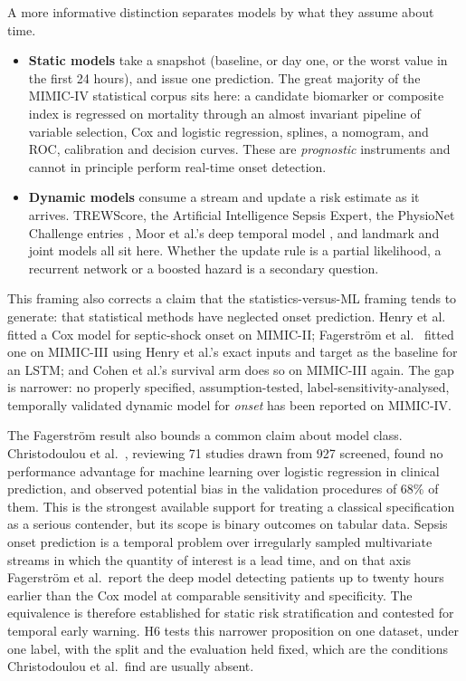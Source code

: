 A more informative distinction separates models by what they assume about
time.

\begin{itemize}
    \item \textbf{Static models} take a snapshot (baseline, or day one, or
    the worst value in the first 24 hours), and issue one prediction. The
    great majority of the MIMIC-IV statistical corpus sits here: a candidate
    biomarker or composite index is regressed on mortality through an almost
    invariant pipeline of variable selection, Cox and logistic regression,
    splines, a nomogram, and ROC, calibration and decision curves. These are
    \emph{prognostic} instruments and cannot in principle perform real-time
    onset detection.
    \item \textbf{Dynamic models} consume a stream and update a risk estimate as
    it arrives. TREWScore, the Artificial Intelligence Sepsis Expert, the
    PhysioNet Challenge entries \cite{reyna2020utility}, Moor et al.'s deep
    temporal model \cite{moor2023review}, and landmark and joint models all sit
    here. Whether the update rule is a partial likelihood, a recurrent network
    or a boosted hazard is a secondary question.
\end{itemize}

This framing also corrects a claim that the statistics-versus-ML framing tends
to generate: that statistical methods have neglected onset prediction. Henry
et al.\ \cite{henry2015trewscore} fitted a Cox
model for septic-shock onset on MIMIC-II; Fagerstr{\"o}m et al.\
\cite{fagerstrom2019lisep} fitted one on MIMIC-III using Henry et al.'s exact
inputs and target as the baseline for an LSTM; and Cohen et al.'s survival arm
does so on MIMIC-III again. The gap is narrower: no properly specified,
assumption-tested, label-sensitivity-analysed, temporally validated dynamic
model for \emph{onset} has been reported on MIMIC-IV.

The Fagerstr{\"o}m result also bounds a common claim about model class.
Christodoulou et al.\ \cite{christodoulou2019cox}, reviewing 71 studies drawn
from 927 screened, found no performance advantage for machine learning over
logistic regression in clinical prediction, and observed potential bias in the
validation procedures of 68\% of them. This is the strongest available
support for treating a classical specification as a serious contender, but its
scope is binary outcomes on tabular data. Sepsis onset prediction is a temporal
problem over irregularly sampled multivariate streams in which the quantity of
interest is a lead time, and on that axis Fagerstr{\"o}m et al.\ report the
deep model detecting patients up to twenty hours earlier than the Cox model at
comparable sensitivity and specificity. The equivalence is therefore
established for static risk stratification and contested for temporal early
warning. H6 tests this narrower proposition on one dataset, under one label,
with the split and the evaluation held fixed, which are the conditions
Christodoulou et al.\ find are usually absent.


